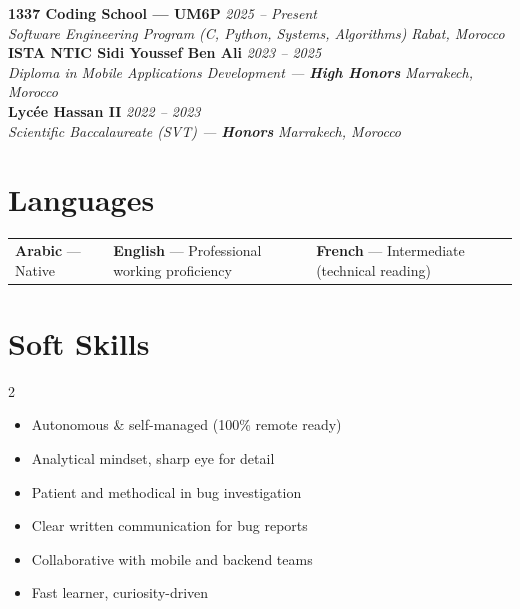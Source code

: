\documentclass[10pt, a4paper]{article}
\newcommand{\entry}[4]{%
  \textbf{\color{black}#1} \hfill \textit{\small\color{medgray}#2}\\
  \textit{\small\color{darkgray}#3} \hfill \textit{\small\color{lightgray}#4}\\
}
\begin{document}
\entry{1337 Coding School — UM6P}{2025 – Present}%
      {Software Engineering Program (C, Python, Systems, Algorithms)}{Rabat, Morocco}

\vspace{4pt}
\entry{ISTA NTIC Sidi Youssef Ben Ali}{2023 – 2025}%
      {Diploma in Mobile Applications Development — \textbf{High Honors}}{Marrakech, Morocco}

\vspace{4pt}
\entry{Lyc\'ee Hassan II}{2022 – 2023}%
      {Scientific Baccalaureate (SVT) — \textbf{Honors}}{Marrakech, Morocco}

\section{Languages}

\begin{tabular}{@{}lll@{}}
  \textbf{Arabic} — Native \quad &
  \textbf{English} — Professional working proficiency \quad &
  \textbf{French} — Intermediate (technical reading)
\end{tabular}

\section{Soft Skills}

\begin{multicols}{2}
\begin{itemize}
  \item Autonomous \& self-managed (100\% remote ready)
  \item Analytical mindset, sharp eye for detail
  \item Patient and methodical in bug investigation
  \item Clear written communication for bug reports
  \item Collaborative with mobile and backend teams
  \item Fast learner, curiosity-driven
\end{itemize}
\end{multicols}
\end{document}
